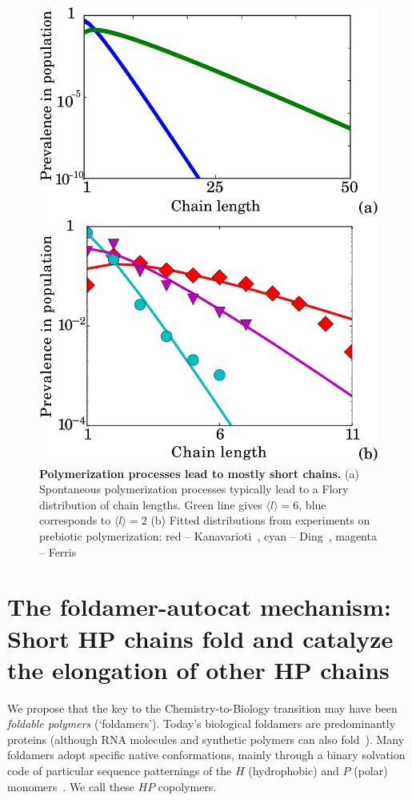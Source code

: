\documentclass[journal=jacsat,manuscript=article,layout=twocolumn]{achemso}
\begin{document}
\begin{figure}[ht!]
  \centering
  \includegraphics[width=0.9\columnwidth]{pictures/flory-two.pdf} 
  \caption{\textbf{Polymerization 
processes lead to mostly short chains.} (a)  Spontaneous 
polymerization processes typically lead to a Flory distribution of chain lengths. 
Green line gives $\langle  l \rangle= 6$, blue corresponds to $\langle l \rangle=2$
(b) Fitted distributions from experiments on prebiotic polymerization: red -- 
Kanavarioti~\cite{Kanavarioti2001}, cyan -- Ding~\cite{Ding1996}, 
magenta -- Ferris~\cite{Ferris1999}}
  \label{fig:flory}
\end{figure}


\section{The foldamer-autocat mechanism: Short HP chains fold and catalyze the elongation of other 
HP chains}

 We propose that the key to the Chemistry-to-Biology transition may have been \emph{foldable 
polymers} (`foldamers').  Today's biological foldamers are predominantly proteins (although RNA 
molecules 
and synthetic polymers can also fold~\cite{Gellman1998,Lee2005a,Capriotti2008}).  Many foldamers 
adopt specific native conformations, mainly through a binary solvation code of particular sequence 
patternings of the $H$ (hydrophobic) and $P$ (polar) monomers~\cite{Chan1991}.  We call these $HP$ 
copolymers.  
\end{document}
